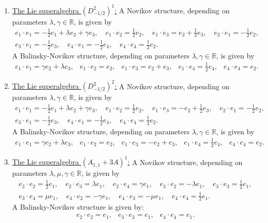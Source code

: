 \documentclass[12pt]{amsart}
\begin{document}
\begin{enumerate}
\[
 \begin{array}{lllll}
e_1 \cdot e_1=  \gamma  e_2 + \lambda e_3, & e_1 \cdot e_2
= e_2, & 
e_1 \cdot e_3= p e_3, & e_1\cdot e_4=\frac{1}{2} e_4, & e_4\cdot e_4=e_2.
 \end{array}
 \]
  \item \underline{The Lie superalgebra 
  $(D^2_{-1/2})^1$:} A Novikov structure, depending on parameters $\lambda, \gamma \in \mathbb R$, is given by 
    \[
\begin{array}{l}
e_1\cdot e_1=-\frac{1}{2}e_1+ \lambda e_2+\gamma e_3, \quad e_1\cdot e_2= \frac{1}{2} e_2, \quad e_1\cdot e_3= e_2+ \frac{1}{2} e_3, \quad e_2\cdot e_1=-\frac{1}{2} e_2, \\[2mm] 
e_3\cdot e_1=-\frac{1}{2} e_3, \quad 
e_4\cdot e_1= -\frac{1}{2} e_4,\quad e_4\cdot e_4=\frac{1}{2}e_2.
\end{array}
 \]
A Balinsky-Novikov structure, depending on parameters $\lambda, \gamma \in \mathbb R$, is given by 
 \[
 \begin{array}{lllll}
e_1 \cdot e_1=  \gamma  e_2+\lambda e_3, & e_1 \cdot e_2
= e_2, & 
e_1 \cdot e_3= e_2+e_3,& e_1\cdot e_4=\frac{1}{2} e_4,& e_4\cdot e_4=e_2.
 \end{array}
 \]

  \item \underline{The Lie superalgebra 
  $(D^2_{-1/2})^2$:} A Novikov structure, depending on parameters $\lambda, \gamma \in \mathbb R$, is given by
    \[
\begin{array}{l}
e_1\cdot e_1=-\frac{1}{2}e_1+ \lambda e_2+\gamma e_3, \quad e_1\cdot e_2= \frac{1}{2} e_2, \quad e_1\cdot e_3= -e_2+ \frac{1}{2} e_3, \quad e_2\cdot e_1=-\frac{1}{2} e_2, \\[2mm] 
e_3\cdot e_1=-\frac{1}{2} e_3, \quad 
e_4\cdot e_1= -\frac{1}{2} e_4,\quad e_4\cdot e_4=\frac{1}{2}e_2.
\end{array}
 \]
A Balinsky-Novikov structure, depending on parameters $\lambda, \gamma \in \mathbb R$, is given by
 \[
 \begin{array}{lllll}
e_1 \cdot e_1=  \gamma  e_2+\lambda e_3, & e_1 \cdot e_2
= e_2, & 
e_1 \cdot e_3= -e_2+e_3,& e_1\cdot e_4=\frac{1}{2} e_4,& e_4\cdot e_4=e_2.
 \end{array}
 \]
  \item \underline{The Lie superalgebra 
  $(A_{1,1}+3A)^1$:} A Novikov structure, depending on parameters $\lambda, \mu, \gamma \in \mathbb R$, is given by
    \[
\begin{array}{l}
e_2\cdot e_2=\frac{1}{2}e_1, \quad e_2\cdot e_3= \lambda e_1, \quad e_2\cdot e_4= \gamma e_1, \quad e_3\cdot e_2=-\lambda e_1, \quad e_3\cdot e_3=\frac{1}{2} e_1,\\[2mm]
e_3\cdot e_4= \mu e_1,\quad e_4\cdot e_2=-\gamma e_1, \quad e_4\cdot e_3=-\mu  e_1, \quad e_4\cdot e_4=\frac{1}{2}e_1.
\end{array}
 \]
A Balinsky-Novikov structure is given by:
 \[
 \begin{array}{llll}
e_2 \cdot e_2=   e_1, & e_3 \cdot e_3
= e_1, & 
e_4 \cdot e_4= e_1.
 \end{array}
 \]


\end{enumerate}
\end{document}
